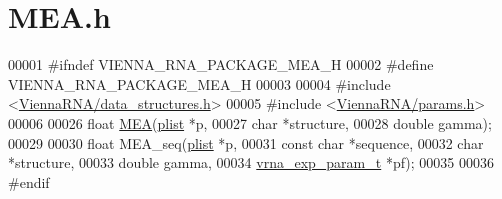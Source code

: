\hypertarget{MEA_8h_source}{}\section{M\+E\+A.\+h}
\label{MEA_8h_source}

\begin{DoxyCode}
00001 \textcolor{preprocessor}{#ifndef VIENNA\_RNA\_PACKAGE\_MEA\_H}
00002 \textcolor{preprocessor}{#define VIENNA\_RNA\_PACKAGE\_MEA\_H}
00003 
00004 \textcolor{preprocessor}{#include <\mbox{\hyperlink{data__structures_8h}{ViennaRNA/data\_structures.h}}>}
00005 \textcolor{preprocessor}{#include <\mbox{\hyperlink{params_8h}{ViennaRNA/params.h}}>}
00006 
00026 \textcolor{keywordtype}{float} \mbox{\hyperlink{group__mea__fold_ga396ec6144c6a74fcbab4cea6b42d76c3}{MEA}}(\mbox{\hyperlink{group__data__structures_structvrna__plist__s}{plist}} *p,
00027           \textcolor{keywordtype}{char} *structure,
00028           \textcolor{keywordtype}{double} gamma);
00029 
00030 \textcolor{keywordtype}{float} MEA\_seq(\mbox{\hyperlink{group__data__structures_structvrna__plist__s}{plist}} *p,
00031               \textcolor{keyword}{const} \textcolor{keywordtype}{char} *sequence,
00032               \textcolor{keywordtype}{char} *structure,
00033               \textcolor{keywordtype}{double} gamma,
00034               \mbox{\hyperlink{group__energy__parameters_structvrna__exp__param__s}{vrna\_exp\_param\_t}} *pf);
00035 
00036 \textcolor{preprocessor}{#endif}
\end{DoxyCode}
